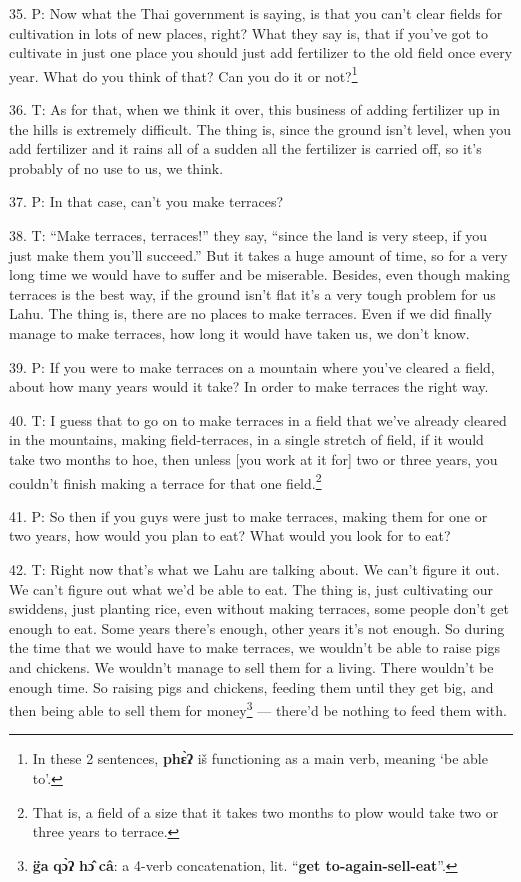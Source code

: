 35. P: Now what the Thai government is saying, is that you can't clear fields for
cultivation in lots of new places, right? What they say is, that if you've got
to cultivate in just one place you should just add fertilizer to the old field
once every year. What do you think of that? Can you do it or not?\footnote{In these 2 sentences, \textbf{phɛ̀ʔ} iš functioning as a main verb, meaning `be able to'.}

36. T: As for that, when we think it over, this business of adding fertilizer up
in the hills is extremely difficult. The thing is, since the ground isn't level,
when you add fertilizer and it rains all of a sudden all the fertilizer is carried
off, so it's probably of no use to us, we think.

37. P: In that case, can't you make terraces?

38. T: ``Make terraces, terraces!'' they say, ``since the land is very steep, if
you just make them you'll succeed.'' But it takes a huge amount of time, so for
a very long time we would have to suffer and be miserable. Besides, even though
making terraces is the best way, if the ground isn't flat it's a very tough problem
for us Lahu. The thing is, there are no places to make terraces. Even if we did
finally manage to make terraces, how long it would have taken us, we don't know.

39. P: If you were to make terraces on a mountain where you've cleared a field,
about how many years would it take? In order to make terraces the right way.

40. T: I guess that to go on to make terraces in a field that we've already cleared
in the mountains, making field-terraces, in a single stretch of field, if it would
take two months to hoe, then unless [you work at it for] two or three years, you
couldn't finish making a terrace for that one field.\footnote{That is, a field of a size that it takes two months to plow would take two or three years to terrace.}

41. P: So then if you guys were just to make terraces, making them for one or two
years, how would you plan to eat? What would you look for to eat?

42. T: Right now that's what we Lahu are talking about. We can't figure it out.
We can't figure out what we'd be able to eat. The thing is, just cultivating our
swiddens, just planting rice, even without making terraces, some people don't get
enough to eat. Some years there's enough, other years it's not enough. So during
the time that we would have to make terraces, we wouldn't be able to raise pigs
and chickens. We wouldn't manage to sell them for a living. There wouldn't be enough
time. So raising pigs and chickens, feeding them until they get big, and then being
able to sell them for money\footnote{\textbf{g̈a} \textbf{qɔ̀ʔ} \textbf{hɔ̂} \textbf{câ}: a 4-verb concatenation, lit. ``\textbf{get to-again-sell-eat}''.} --- there'd be nothing to feed them with.

